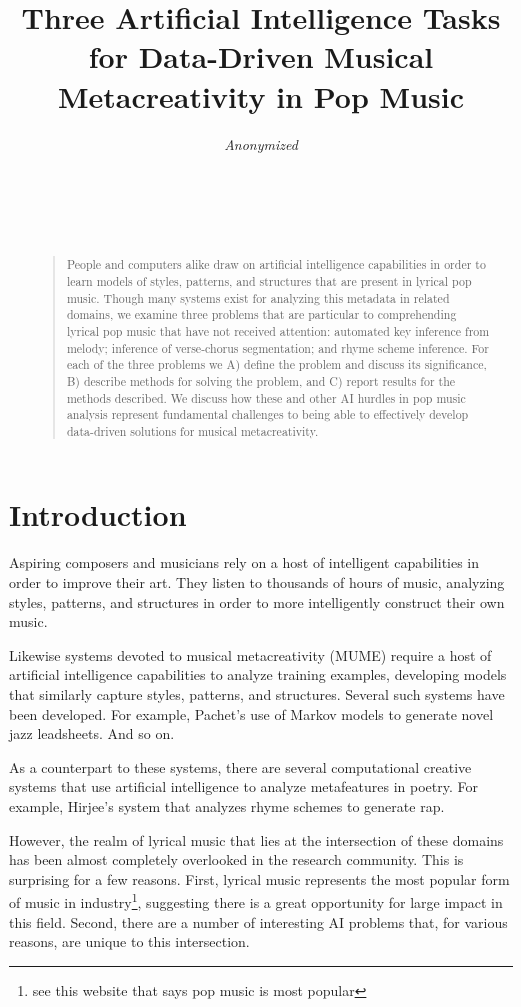 \documentclass[letterpaper]{article}
\title{Three Artificial Intelligence Tasks for Data-Driven Musical Metacreativity in Pop Music}
\author{\emph{Anonymized}\\
\\
\\
\\
\\}
\begin{document}
 
\maketitle
\begin{abstract}
\begin{quote}
People and computers alike draw on artificial intelligence capabilities in order to learn models of styles, patterns, and structures that are present in lyrical pop music. Though many systems exist for analyzing this metadata in related domains, we examine three problems that are particular to comprehending lyrical pop music that have not received attention: automated key inference from melody; inference of verse-chorus segmentation; and rhyme scheme inference. For each of the three problems we A) define the problem and discuss its significance, B) describe methods for solving the problem, and C) report results for the methods described. We discuss how these and other AI hurdles in pop music analysis represent fundamental challenges to being able to effectively develop data-driven solutions for musical metacreativity. 
\end{quote}
\end{abstract}

\section{Introduction}
Aspiring composers and musicians rely on a host of intelligent capabilities in order to improve their art. They listen to thousands of hours of music, analyzing styles, patterns, and structures in order to more intelligently construct their own music.

Likewise systems devoted to musical metacreativity (MUME) require a host of artificial intelligence capabilities to analyze training examples, developing models that similarly capture styles, patterns, and structures. Several such systems have been developed. For example, Pachet's use of Markov models to generate novel jazz leadsheets. And so on.

As a counterpart to these systems, there are several computational creative systems that use artificial intelligence to analyze metafeatures in poetry. For example, Hirjee's system that analyzes rhyme schemes to generate rap. 

However, the realm of lyrical music that lies at the intersection of these domains has been almost completely overlooked in the research community. This is surprising for a few reasons. First, lyrical music represents the most popular form of music in industry\footnote{see this website that says pop music is most popular}, suggesting there is a great opportunity for large impact in this field. Second, there are a number of interesting AI problems that, for various reasons, are unique to this intersection.
\end{document}
